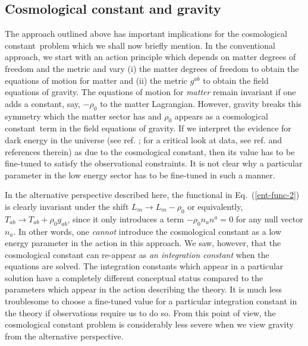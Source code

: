 \documentclass[12pt]{iopart}
\def\eq#1{{Eq.~(\ref{#1})}}
\newcommand{\cc}{cosmological constant}
\begin{document}
 
 \subsection{Cosmological constant and gravity}\label{sec:cc}
 
 The approach outlined above has important implications for the \cc\ problem  \cite{ccreview} which we shall now briefly mention.
In the conventional approach, 
 we start with an action principle which depends on matter degrees of freedom and the metric 
 and vary (i) the matter degrees of freedom to obtain the equations of motion for
matter and (ii) the metric $g^{ab}$ to obtain the field equations of gravity.
The equations of motion for \textit{matter} remain invariant if one adds a constant,
say, $-\rho_0$ to the matter Lagrangian.
However, gravity breaks
this symmetry which the matter sector has and $\rho_0$ appears as a \cc\ term in the field equations of gravity. If we interpret the evidence for dark energy in the 
universe (see ref. \cite{sn}; for a critical look at data, see ref. \cite{tptirthsn1} and references therein)
as due to the cosmological constant, then its value has to be
fine-tuned  to satisfy the observational constraints.
It is not clear why a particular parameter in the low energy  sector has to be fine-tuned in such a manner. 

In the alternative perspective described here,
the functional in \eq{ent-func-2} is clearly invariant under the shift $L_m \to L_m - \rho_0$ or equivalently, $T_{ab} \to T_{ab} + \rho_0 g_{ab}$, 
since it only introduces a term $-\rho_0 n_a n^a =0$ for any null vector $n_a$.
In other words, one \textit{cannot} introduce the cosmological constant
as  a low energy parameter in the action in this approach. We saw, however, 
that the cosmological constant can re-appear as  \textit{an integration constant} when the equations 
are solved. The integration constants which appear in a particular solution  have a completely different conceptual status compared to the parameters which appear in the action describing
the theory. It is much less troublesome to choose a fine-tuned value for a particular integration constant in the theory if observations require us to do so.
From this point of view, the cosmological constant problem is considerably less severe
when we view gravity from the alternative perspective. 
\end{document}

